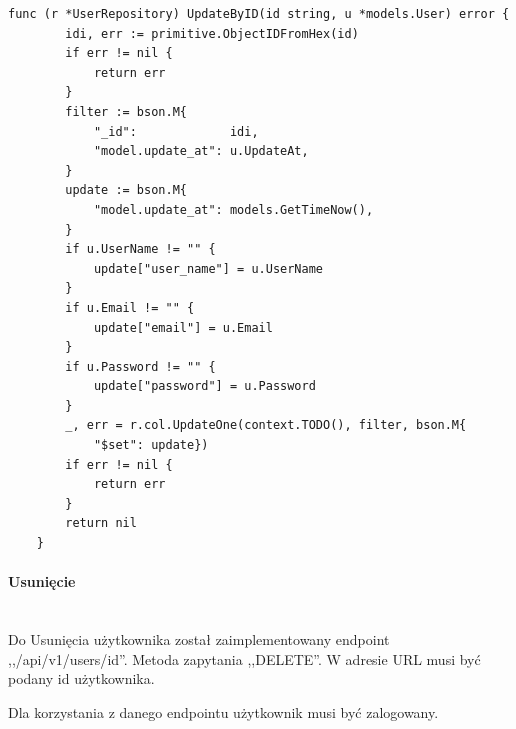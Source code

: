 \begin{lstlisting}[label=list:user_repository_UpdateByID,caption=Edycja uzytkownika w bazie danych,basicstyle=\tiny\ttfamily]
    func (r *UserRepository) UpdateByID(id string, u *models.User) error {
        idi, err := primitive.ObjectIDFromHex(id)
        if err != nil {
            return err
        }
        filter := bson.M{
            "_id":             idi,
            "model.update_at": u.UpdateAt,
        }
        update := bson.M{
            "model.update_at": models.GetTimeNow(),
        }
        if u.UserName != "" {
            update["user_name"] = u.UserName
        }
        if u.Email != "" {
            update["email"] = u.Email
        }
        if u.Password != "" {
            update["password"] = u.Password
        }
        _, err = r.col.UpdateOne(context.TODO(), filter, bson.M{
            "$set": update})
        if err != nil {
            return err
        }
        return nil
    }
\end{lstlisting}

\paragraph{Usunięcie}\mbox{}\\

Do Usunięcia użytkownika został zaimplementowany endpoint ,,/api/v1/users/{id}''.
Metoda zapytania ,,DELETE''.
W adresie URL musi być podany id użytkownika.

Dla korzystania z danego endpointu użytkownik musi być zalogowany.

